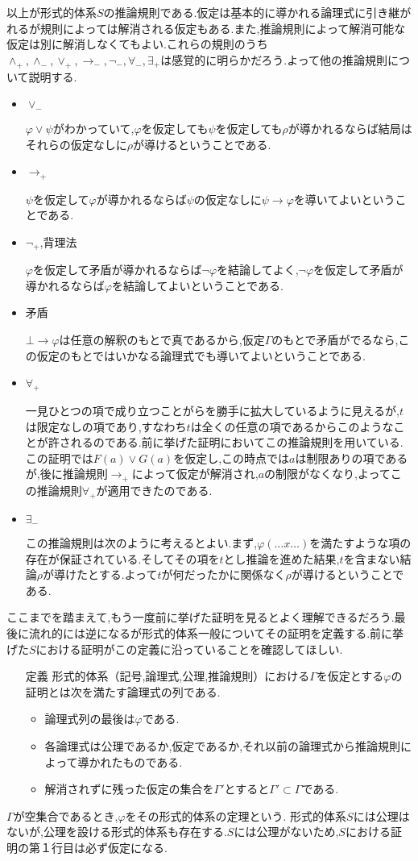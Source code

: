 \documentclass[10pt,b5paper,papersize,dvipdfmx]{jsbook}
\begin{document}
以上が形式的体系$S$の推論規則である.仮定は基本的に導かれる論理式に引き継がれるが規則によっては解消される仮定もある.また,推論規則によって解消可能な仮定は別に解消しなくてもよい.これらの規則のうち$\land_+,\land_-,\lor_+,\to_-,\lnot_-,\forall_-,\exists_+$は感覚的に明らかだろう.よって他の推論規則について説明する.
\begin{itemize}
\item $\lor_-$ \par
$\varphi \lor \psi$がわかっていて,$\varphi$を仮定しても$\psi$を仮定しても$\rho$が導かれるならば結局はそれらの仮定なしに$\rho$が導けるということである.
\item $\to_+$ \par
$\psi$を仮定して$\varphi$が導かれるならば$\psi$の仮定なしに$\psi \to \varphi$を導いてよいということである.
\item $\lnot_+$,背理法 \par
$\varphi$を仮定して矛盾が導かれるならば$\lnot \varphi$を結論してよく,$\lnot \varphi$を仮定して矛盾が導かれるならば$\varphi$を結論してよいということである.
\item 矛盾 \par
$\bot \to \varphi$は任意の解釈のもとで真であるから,仮定$\Gamma$のもとで矛盾がでるなら,この仮定のもとではいかなる論理式でも導いてよいということである.
\item $\forall_+$ \par
一見ひとつの項で成り立つことがらを勝手に拡大しているように見えるが,$t$は限定なしの項であり,すなわち$t$は全くの任意の項であるからこのようなことが許されるのである.前に挙げた証明においてこの推論規則を用いている.この証明では$F(a)\lor G(a)$を仮定し,この時点では$a$は制限ありの項であるが,後に推論規則$\to_+$によって仮定が解消され,$a$の制限がなくなり,よってこの推論規則$\forall_+$が適用できたのである.
\item $\exists_-$ \par
この推論規則は次のように考えるとよい.まず,$\varphi(\dots x \dots)$を満たすような項の存在が保証されている.そしてその項を$t$とし推論を進めた結果,$t$を含まない結論$\rho$が導けたとする.よって$t$が何だったかに関係なく$\rho$が導けるということである.
\end{itemize}
ここまでを踏まえて,もう一度前に挙げた証明を見るとよく理解できるだろう.最後に流れ的には逆になるが形式的体系一般についてその証明を定義する.前に挙げた$S$における証明がこの定義に沿っていることを確認してほしい.
\begin{itemize}
\item[定義] 形式的体系（記号,論理式,公理,推論規則）における$\Gamma$を仮定とする$\varphi$の証明とは次を満たす論理式の列である.
\begin{itemize}
\item 論理式列の最後は$\varphi$である.
\item 各論理式は公理であるか,仮定であるか,それ以前の論理式から推論規則によって導かれたものである.
\item 解消されずに残った仮定の集合を$\Gamma'$とすると$\Gamma'\subset \Gamma$である.
\end{itemize}
\end{itemize}
$\Gamma$が空集合であるとき,$\varphi$をその形式的体系の定理という.
形式的体系$S$には公理はないが,公理を設ける形式的体系も存在する.$S$には公理がないため,$S$における証明の第１行目は必ず仮定になる.
\end{document}

